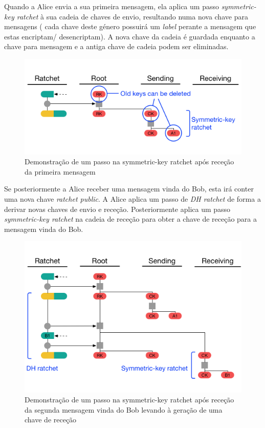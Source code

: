 Quando a Alice envia a sua primeira mensagem, ela aplica um passo \textit{symmetric-key ratchet} à sua cadeia de chaves de envio, resultando numa nova chave para mensagens ( cada chave deste género possuirá um \textit{label} perante a mensagem que estas encriptam/ desencriptam). A nova chave da cadeia é guardada enquanto a chave para mensagem e a antiga chave de cadeia podem ser eliminadas.

\begin{figure}[H]
\begin{center}
\includegraphics[width=12cm]{img/DR2.png}
\caption{Demonstração de um passo na symmetric-key ratchet após receção da primeira mensagem}
\label{diagram:DR2} 
\centering
\end{center}
\end{figure}

Se posteriormente a Alice receber uma mensagem vinda do Bob, esta irá conter uma nova chave \textit{ratchet public}. A Alice aplica um passo de \textit{DH ratchet} de forma a derivar novas chaves de envio e receção. Posteriormente aplica um passo \textit{symmetric-key ratchet} na cadeia de receção para obter a chave de receção para a mensagem vinda do Bob.

\begin{figure}[H]
\begin{center}
\includegraphics[width=12cm]{img/DR3.png}
\caption{Demonstração de um passo na symmetric-key ratchet após receção da segunda mensagem vinda do Bob levando à geração de uma chave de receção}
\label{diagram:DR3} 
\centering
\end{center}
\end{figure}

